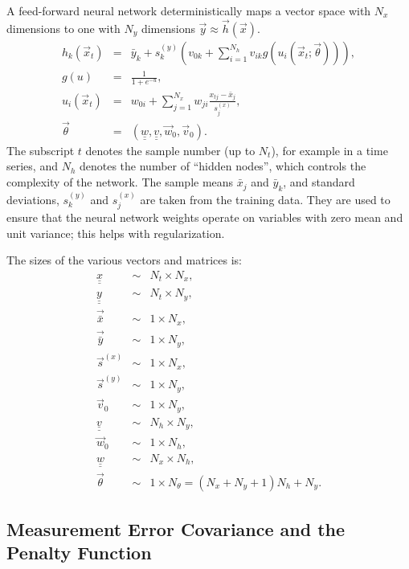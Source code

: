 \documentclass{article}    %
\newcommand{\dbul}[1]{\underline{\underline{#1}}}
\begin{document}
A feed-forward neural network deterministically maps a vector space
with $N_x$ dimensions to one with $N_y$ dimensions $\vec{y} \approx
\vec{h}(\vec{x})$.
\begin{eqnarray}
h_k(\vec{x}_t) &=& \bar{y}_k + s^{(y)}_k\left(v_{0k} + \sum_{i=1}^{N_h} v_{ik} g(u_i(\vec{x}_t;\vec\theta))\right), \\
g(u) &=& \frac{1}{1+e^{-u}}, \\
u_i(\vec{x}_t) &=& w_{0i} + \sum_{j=1}^{N_x} w_{ji} \frac{x_{tj}-\bar{x}_{j}}{s^{(x)}_j}, \\
\vec\theta &=& (\dbul{w}, \dbul{v},\vec{w}_0,\vec{v}_0). \label{eq_theta}
\end{eqnarray}
The subscript $t$ denotes the sample number (up to $N_t$), for example
in a time series, and $N_h$ denotes the number of ``hidden nodes'',
which controls the complexity of the network. The sample means
$\bar{x}_j$ and $\bar{y}_k$, and standard deviations, $s^{(y)}_k$ and
$s^{(x)}_j$ are taken from the training data. They are used to ensure
that the neural network weights operate on variables with zero mean
and unit variance; this helps with regularization.

The sizes of the various vectors and matrices is:
\begin{eqnarray}
\dbul{x} &\sim& N_t \times N_x, \\
\dbul{y} &\sim& N_t \times N_y, \\
\vec{\bar{x}} &\sim& 1 \times N_x, \\
\vec{\bar{y}} &\sim& 1 \times N_y, \\
\vec{s}^{(x)} &\sim& 1 \times N_x, \\
\vec{s}^{(y)} &\sim& 1 \times N_y, \\
\vec{v}_0 &\sim& 1 \times N_y, \\
\dbul{v} &\sim& N_h \times N_y, \\
\vec{w}_0 &\sim& 1 \times N_h, \\
\dbul{w} &\sim& N_x \times N_h, \\
\vec\theta &\sim& 1 \times  N_\theta = (N_x +N_y+1)N_h + N_y.
\end{eqnarray}

\subsection{Measurement Error Covariance and the Penalty Function}
\end{document}
